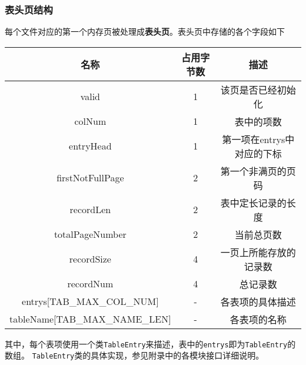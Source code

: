 \documentclass[11pt]{article}
\begin{document}
\subsubsection{表头页结构}
每个文件对应的第一个内存页被处理成\textbf{表头页}。表头页中存储的各个字段如下\\
\begin{center}
    \begin{tabular}{|c|c|c|}
        \hline
            \textbf{名称}                  & \textbf{占用字节数} & \textbf{描述}\\
        \hline 
            valid                          & 1                  & 该页是否已经初始化\\
        \hline 
            colNum                         & 1                  & 表中的项数\\
        \hline 
            entryHead                      & 1                  & 第一项在entrys中对应的下标\\
        \hline
            firstNotFullPage               & 2                  & 第一个非满页的页码\\
        \hline
            recordLen                      & 2                  & 表中定长记录的长度\\
        \hline
            totalPageNumber                & 2                  & 当前总页数\\
        \hline
            recordSize                     & 4                  & 一页上所能存放的记录数\\
        \hline
            recordNum                      & 4                  & 总记录数\\
        \hline
            entrys[TAB\_MAX\_COL\_NUM]     & -                  & 各表项的具体描述\\
        \hline
            tableName[TAB\_MAX\_NAME\_LEN] & -                  & 各表项的名称\\
        \hline
    \end{tabular}  
\end{center}
其中，每个表项使用一个类\texttt{TableEntry}来描述，表中的\texttt{entrys}即为\texttt{TableEntry}的数组。
\texttt{TableEntry}类的具体实现，参见附录中的各模块接口详细说明。
    
\end{document}
